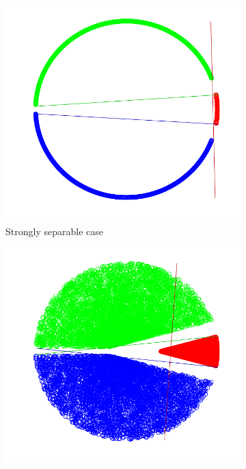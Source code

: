 \begin{figure}[h!]
    \centering
    \begin{subfigure}[b]{0.23\textwidth}
        \captionsetup{justification=centering}
        \begin{center}
        \hspace*{-0.3cm} \includegraphics[width=1.15\textwidth, trim={0, 0cm, 0, 0}, clip]{figures/strong_linear_ova_points}
        \caption{Strongly separable case}
        \end{center}
    \end{subfigure}
    \hfill
    \begin{subfigure}[b]{0.23\textwidth}
        \captionsetup{justification=centering}
        \centering
        \hspace*{-0.3cm}  \includegraphics[width=1.15\textwidth, trim={0, 0cm, 0, 0}, clip]{figures/weak_linear_ova_points}

\end{subfigure}
\end{figure}
